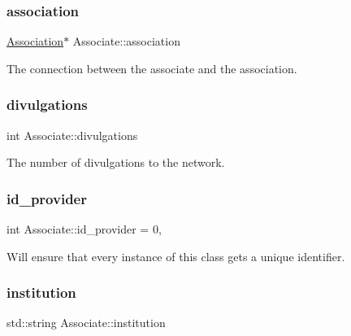 \subsubsection{\texorpdfstring{association}{association}}
{\footnotesize\ttfamily \mbox{\hyperlink{classAssociation}{Association}}$\ast$ Associate\+::association\hspace{0.3cm}{\ttfamily [private]}}



The connection between the associate and the association. 

\mbox{\label{classAssociate_a5f697e757ce7e1be1ed4a2421679b804}} 
\subsubsection{\texorpdfstring{divulgations}{divulgations}}
{\footnotesize\ttfamily int Associate\+::divulgations\hspace{0.3cm}{\ttfamily [private]}}



The number of divulgations to the network. 

\mbox{\label{classAssociate_a9fcd0a229b70369a3f6beaf7a02fe58f}} 
\subsubsection{\texorpdfstring{id\+\_\+provider}{id\_provider}}
{\footnotesize\ttfamily int Associate\+::id\+\_\+provider = 0\hspace{0.3cm}{\ttfamily [static]}, {\ttfamily [private]}}



Will ensure that every instance of this class gets a unique identifier. 

\mbox{\label{classAssociate_a25b82eab07e159a91ebdc64fa4d656ab}} 
\subsubsection{\texorpdfstring{institution}{institution}}
{\footnotesize\ttfamily std\+::string Associate\+::institution\hspace{0.3cm}{\ttfamily [private]}}




